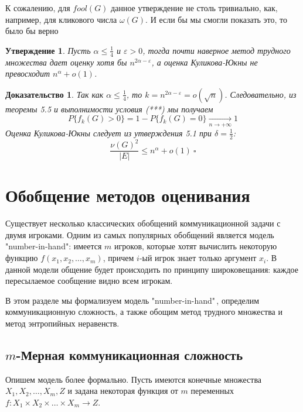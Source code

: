 \documentclass[a4paper]{article}
\newtheorem*{msolution}{Доказательство}
\newtheorem{mclaim}{Утверждение}[section]
\begin{document}
К сожалению, для $fool(G)$ данное утверждение не столь тривиально, как, например, для кликового числа $\omega(G)$. И если бы 
мы смогли показать это, то было бы верно
\begin{mclaim}
    Пусть $\alpha \leq \frac{1}{4}$ и $\varepsilon > 0$, тогда почти наверное 
    метод трудного множества дает оценку хотя бы $n^{2\alpha - \varepsilon}$, а оценка Куликова-Юкны 
    не превосходит $n^{\alpha} + o(1)$. 
\end{mclaim}
\begin{msolution}
    Так как $\alpha \leq \frac{1}{4}$, то $k = n^{2\alpha - \varepsilon} = o(\sqrt{n})$. Следовательно, из 
    теоремы 5.5 и выполнимости условия (***) мы получаем $$P\{f_k(G) > 0\} = 1 - P\{f_k(G) = 0\}\xrightarrow[n \to +\infty]{} 1$$
    Оценка Куликова-Юкны следует из утверждения 5.1 при $\delta = \frac{1}{2}$:
    $$\frac{\nu(G)^2}{|E|} \leq n^{\alpha} + o(1)\ \square$$ 
\end{msolution}



\setcounter{mclaim}{0}
\setcounter{mlemma}{0}	
\setcounter{mtheorem}{0}
\addtocounter{section}{1}
\section*{Обобщение методов оценивания}
Существует несколько классических обобщений коммуникационной задачи с двумя игроками. Одним из самых 
популярных обобщений является модель "number-in-hand": имеется $m$ игроков, которые хотят вычислить 
некоторую функцию $f(x_1,x_2,\ldots,x_m)$, причем $i$-ый игрок знает только аргумент $x_i$. В данной модели 
общение будет происходить по принципу широковещания: каждое пересылаемое сообщение видно всем игрокам.

В этом разделе мы формализуем модель "number-in-hand"\,, определим коммуникационную сложность, а также 
обощим метод трудного множества и метод энтропийных неравенств.

\setcounter{subsection}{0}
\subsection{$m$-Мерная коммуникационная сложность}

Опишем модель более формально. Пусть имеются конечные множества $X_1, X_2, \ldots, X_m, Z$ и задана
некоторая функция от $m$ переменных $f:X_1\times X_2\times \ldots\times X_m\rightarrow Z$.
\end{document}
